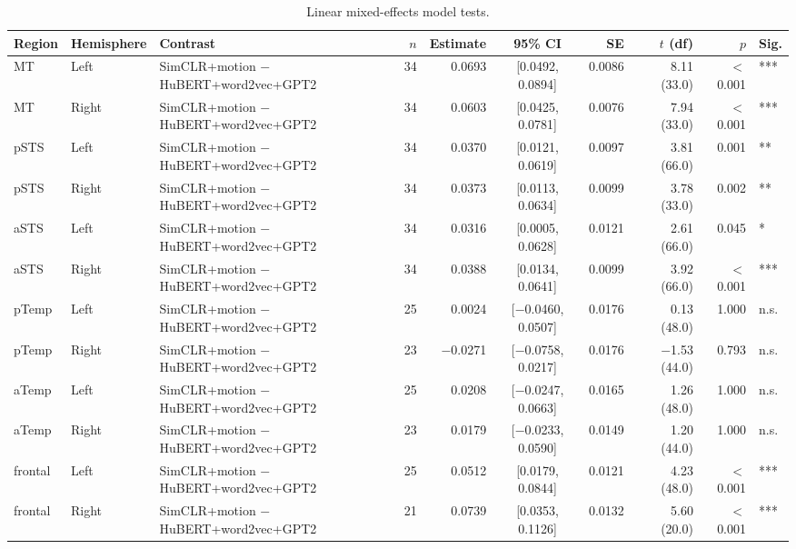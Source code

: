 \begin{table}[h]
\centering
\begin{tabular}{lllrrcrrrl}
\toprule
Region & Hemisphere & Contrast & $n$ & Estimate & 95\% CI & SE & $t$ (df) & $p$ & Sig. \\
\midrule
MT & Left & SimCLR+motion $-$ HuBERT+word2vec+GPT2 & 34 & 0.0693 & [0.0492, 0.0894] & 0.0086 & 8.11 (33.0) & $<$0.001 & *** \\
MT & Right & SimCLR+motion $-$ HuBERT+word2vec+GPT2 & 34 & 0.0603 & [0.0425, 0.0781] & 0.0076 & 7.94 (33.0) & $<$0.001 & *** \\
pSTS & Left & SimCLR+motion $-$ HuBERT+word2vec+GPT2 & 34 & 0.0370 & [0.0121, 0.0619] & 0.0097 & 3.81 (66.0) & 0.001 & ** \\
pSTS & Right & SimCLR+motion $-$ HuBERT+word2vec+GPT2 & 34 & 0.0373 & [0.0113, 0.0634] & 0.0099 & 3.78 (33.0) & 0.002 & ** \\
aSTS & Left & SimCLR+motion $-$ HuBERT+word2vec+GPT2 & 34 & 0.0316 & [0.0005, 0.0628] & 0.0121 & 2.61 (66.0) & 0.045 & * \\
aSTS & Right & SimCLR+motion $-$ HuBERT+word2vec+GPT2 & 34 & 0.0388 & [0.0134, 0.0641] & 0.0099 & 3.92 (66.0) & $<$0.001 & *** \\
pTemp & Left & SimCLR+motion $-$ HuBERT+word2vec+GPT2 & 25 & 0.0024 & [$-$0.0460, 0.0507] & 0.0176 & 0.13 (48.0) & 1.000 & n.s. \\
pTemp & Right & SimCLR+motion $-$ HuBERT+word2vec+GPT2 & 23 & $-$0.0271 & [$-$0.0758, 0.0217] & 0.0176 & $-$1.53 (44.0) & 0.793 & n.s. \\
aTemp & Left & SimCLR+motion $-$ HuBERT+word2vec+GPT2 & 25 & 0.0208 & [$-$0.0247, 0.0663] & 0.0165 & 1.26 (48.0) & 1.000 & n.s. \\
aTemp & Right & SimCLR+motion $-$ HuBERT+word2vec+GPT2 & 23 & 0.0179 & [$-$0.0233, 0.0590] & 0.0149 & 1.20 (44.0) & 1.000 & n.s. \\
frontal & Left & SimCLR+motion $-$ HuBERT+word2vec+GPT2 & 25 & 0.0512 & [0.0179, 0.0844] & 0.0121 & 4.23 (48.0) & $<$0.001 & *** \\
frontal & Right & SimCLR+motion $-$ HuBERT+word2vec+GPT2 & 21 & 0.0739 & [0.0353, 0.1126] & 0.0132 & 5.60 (20.0) & $<$0.001 & *** \\
\bottomrule
\end{tabular}
\caption{Linear mixed-effects model tests.}
\end{table}
